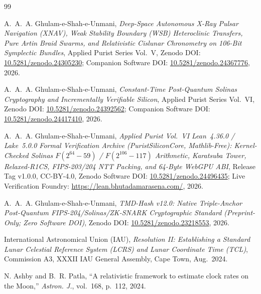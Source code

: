 \documentclass[11pt,a4paper,reqno]{article}
\def\texttt#1{#1}%
\def\mathbb#1{#1}%
\def\F#1{F(#1)}%
\theoremstyle{plain}
\theoremstyle{definition}
\theoremstyle{remark}
\numberwithin{equation}{section}
\numberwithin{table}{section}
\newcommand{\F}[1]{\mathbb{F}_{#1}}
\begin{document}
\begin{thebibliography}{99}

A.~A.~A. Ghulam-e-Shah-e-Unmani, \emph{Deep-Space Autonomous X-Ray Pulsar Navigation (XNAV), Weak Stability Boundary (WSB) Heteroclinic Transfers, Pure Artin Braid Swarms, and Relativistic Cislunar Chronometry on 106-Bit Symplectic Bundles}, Applied Purist Series Vol.~V, Zenodo DOI: \href{https://doi.org/10.5281/zenodo.24305230}{10.5281/zenodo.24305230}; Companion Software DOI: \href{https://doi.org/10.5281/zenodo.24367776}{10.5281/zenodo.24367776}, 2026.

A.~A.~A. Ghulam-e-Shah-e-Unmani, \emph{Constant-Time Post-Quantum Solinas Cryptography and Incrementally Verifiable Silicon}, Applied Purist Series Vol.~VI, Zenodo DOI: \href{https://doi.org/10.5281/zenodo.24392562}{10.5281/zenodo.24392562}; Companion Software DOI: \href{https://doi.org/10.5281/zenodo.24417410}{10.5281/zenodo.24417410}, 2026.

A.~A.~A. Ghulam-e-Shah-e-Unmani, \emph{Applied Purist Vol.~VI Lean~4.36.0 / Lake~5.0.0 Formal Verification Archive (\texttt{PuristSiliconCore}, Mathlib-Free): Kernel-Checked Solinas $\F{2^{64}-59}$ / $\F{2^{106}-117}$ Arithmetic, Karatsuba Tower, Relaxed-R1CS, FIPS-203/204 NTT Packing, and 64-Byte WebGPU ABI}, Release Tag \texttt{v1.0.0}, CC-BY-4.0, Zenodo Software DOI: \href{https://doi.org/10.5281/zenodo.24496435}{10.5281/zenodo.24496435}; Live Verification Foundry: \url{https://lean.bhutadamarasena.com/}, 2026.

A.~A.~A. Ghulam-e-Shah-e-Unmani, \emph{TMD-Hash v12.0: Native Triple-Anchor Post-Quantum FIPS-204/Solinas/ZK-SNARK Cryptographic Standard (Preprint-Only; Zero Software DOI)}, Zenodo DOI: \href{https://doi.org/10.5281/zenodo.23218553}{10.5281/zenodo.23218553}, 2026.

International Astronomical Union (IAU), \emph{Resolution II: Establishing a Standard Lunar Celestial Reference System (LCRS) and Lunar Coordinate Time (TCL)}, Commission A3, XXXII IAU General Assembly, Cape Town, Aug.~2024.

N. Ashby and B.~R. Patla, ``A relativistic framework to estimate clock rates on the Moon,'' \emph{Astron. J.}, vol.~168, p.~112, 2024.


\end{thebibliography}
\end{document}
